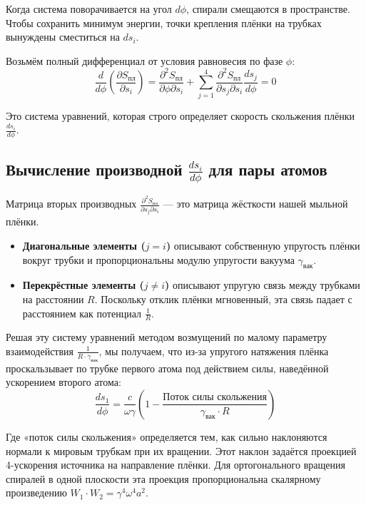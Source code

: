 \documentclass[12pt,a4paper]{article}
\begin{document}
Когда система поворачивается на угол $d\phi$, спирали смещаются в пространстве. Чтобы сохранить минимум энергии, точки крепления плёнки на трубках вынуждены сместиться на $ds_i$.

Возьмём полный дифференциал от условия равновесия по фазе $\phi$:
\begin{equation}
\frac{d}{d\phi} \left( \frac{\partial S_{пл}}{\partial s_i} \right) = \frac{\partial^2 S_{пл}}{\partial \phi \partial s_i} + \sum_{j=1}^{4} \frac{\partial^2 S_{пл}}{\partial s_j \partial s_i} \frac{ds_j}{d\phi} = 0
\end{equation}

Это система уравнений, которая строго определяет скорость скольжения плёнки $\frac{ds_i}{d\phi}$.

\subsection*{Вычисление производной $\frac{ds_i}{d\phi}$ для пары атомов}

Матрица вторых производных $\frac{\partial^2 S_{пл}}{\partial s_j \partial s_i}$ — это матрица жёсткости нашей мыльной плёнки.

\begin{itemize}
    \item \textbf{Диагональные элементы ($j=i$)} описывают собственную упругость плёнки вокруг трубки и пропорциональны модулю упругости вакуума $\gamma_{вак}$.
    \item \textbf{Перекрёстные элементы ($j \neq i$)} описывают упругую связь между трубками на расстоянии $R$. Поскольку отклик плёнки мгновенный, эта связь падает с расстоянием как потенциал $\frac{1}{R}$.
\end{itemize}

Решая эту систему уравнений методом возмущений по малому параметру взаимодействия $\frac{1}{R \cdot \gamma_{вак}}$, мы получаем, что из-за упругого натяжения плёнка проскальзывает по трубке первого атома под действием силы, наведённой ускорением второго атома:
\begin{equation}
\frac{ds_1}{d\phi} = \frac{c}{\omega \gamma} \left( 1 - \frac{\text{Поток силы скольжения}}{\gamma_{вак} \cdot R} \right)
\end{equation}

Где «поток силы скольжения» определяется тем, как сильно наклоняются нормали к мировым трубкам при их вращении. Этот наклон задаётся проекцией 4-ускорения источника на направление плёнки. Для ортогонального вращения спиралей в одной плоскости эта проекция пропорциональна скалярному произведению $W_1 \cdot W_2 = \gamma^4 \omega^4 a^2$.
\end{document}
